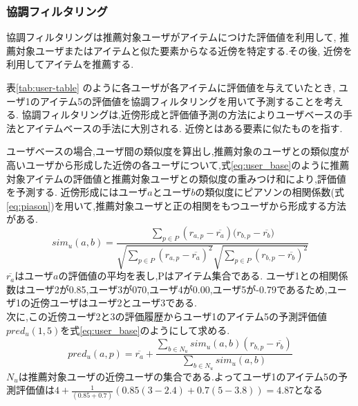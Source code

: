 \subsubsection{協調フィルタリング}
  協調フィルタリングは推薦対象ユーザがアイテムにつけた評価値を利用して, 推薦対象ユーザまたはアイテムと似た要素からなる近傍を特定する.その後, 近傍を利用してアイテムを推薦する.\cite{rec_text}\par
\begin{comment}
大規模なサービスで用いられることの多いアイテムベースフィルタリングについて紹介する.\par
\end{comment}
表\ref{tab:user-table} のように各ユーザが各アイテムに評価値を与えていたとき, ユーザ1のアイテム5の評価値を協調フィルタリングを用いて予測することを考える.
協調フィルタリングは,近傍形成と評価値予測の方法によりユーザベースの手法\cite{user-based-collaborative-filtering}とアイテムベースの手法\cite{item-based-collaborative-filtering}に大別される.
近傍とはある要素に似たものを指す.\par
ユーザベースの場合,ユーザ間の類似度を算出し,推薦対象のユーザとの類似度が高いユーザから形成した近傍の各ユーザについて,式\eqref{eq:user_base}のように推薦対象アイテムの評価値と推薦対象ユーザとの類似度の重みつけ和により,評価値を予測する.
近傍形成にはユーザ$a$とユーザ$b$の類似度にピアソンの相関係数(式\eqref{eq:piason})を用いて,推薦対象ユーザと正の相関をもつユーザから形成する方法がある.
\\
\begin{equation}
\label{eq:piason}
sim_u(a,b)=\frac{\sum_{p\in P}^{}{(r_{a,p}-\overline{r_a})(r_{b,p}-\overline{r_b}})}{\sqrt{\sum_{p\in P}^{}{(r_{a,p}-\overline{r_a})^2}} \sqrt{\sum_{p\in P}^{}{(r_{b,p}-\overline{r_b})^2}}}
\end{equation}
$\overline{r_a}$はユーザ$a$の評価値の平均を表し,Pはアイテム集合である.
ユーザ1との相関係数はユーザ2が0.85,ユーザ3が070,ユーザ4が0.00,ユーザ5が-0.79であるため,ユーザ1の近傍ユーザはユーザ2とユーザ3である.\\
次に,この近傍ユーザ2と3の評価履歴からユーザ1のアイテム5の予測評価値$pred_u(1,5)$を式\eqref{eq:user_base}のようにして求める.
\begin{equation}
  \label{eq:user_base}
  pred_u(a,p)=\overline{r_a}+\frac{\sum_{b\in N_u}{sim_u(a,b)(r_{b,p}-\overline{r_b})}}{\sum_{b\in N_u}{sim_u(a,b)}}
\end{equation}
$N_u$は推薦対象ユーザの近傍ユーザの集合である.よってユーザ1のアイテム5の予測評価値は$4+\frac{1}{(0.85+0.7)}(0.85(3-2.4)+0.7(5-3.8))=4.87$となる

